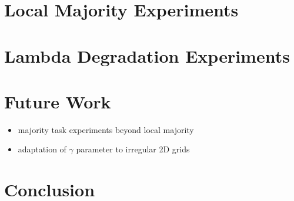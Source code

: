 \documentclass[a4paper,11pt]{report}
\begin{document}
\chapter{Local Majority Experiments}
\label{ch:local_maj}

\chapter{Lambda Degradation Experiments}
\label{ch:lambda_degen}

\chapter{Future Work}
\label{ch:future_work}

\begin{itemize}

\item majority task experiments beyond local majority
\item adaptation of $\gamma$ parameter to irregular 2D grids

\end{itemize}

\chapter{Conclusion}
\label{ch:conclusion}
\end{document}
